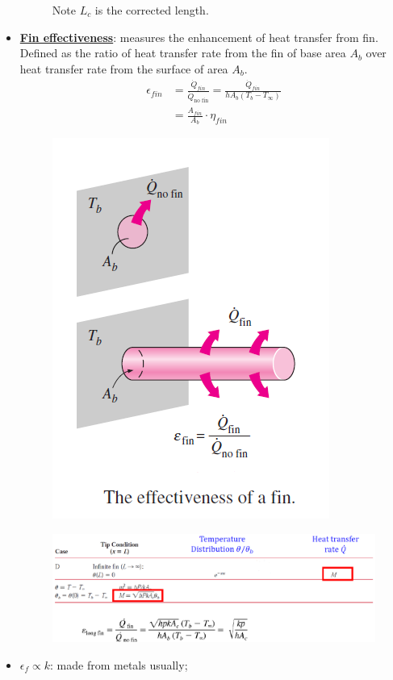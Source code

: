 \begin{itemize}
\begin{figure}[H]
        \caption{Note $L_c$ is the corrected length.}
    \end{figure}
    \item \underline{\textbf{Fin effectiveness}}: measures the enhancement of heat transfer from fin. Defined as the ratio of \color{red} heat transfer rate from the fin of base area $A_b$ \color{black} over \color{blue} heat transfer rate from the surface of area $A_b$. \color{black}
    \begin{align*}
        \epsilon_{fin} &= \frac{\dot{Q}_{fin}}{\dot{Q}_{\text{no fin}}} = \frac{\dot{Q}_{fin}}{h A_b (T_b - T_{\infty})} \\
        &= \frac{A_{fin}}{A_b} \cdot \eta_{fin}
    \end{align*}
    \begin{figure}[H]
        \centering
        \includegraphics[width=0.5\linewidth]{images/fin_effectiveness.png}
    \end{figure}
    \begin{figure}[H]
        \centering
        \includegraphics[width=1.0\linewidth]{images/fin_effectiveness_relation.png}
    \end{figure}
    \item $\epsilon_f \propto k$: made from metals usually;

\end{itemize}
